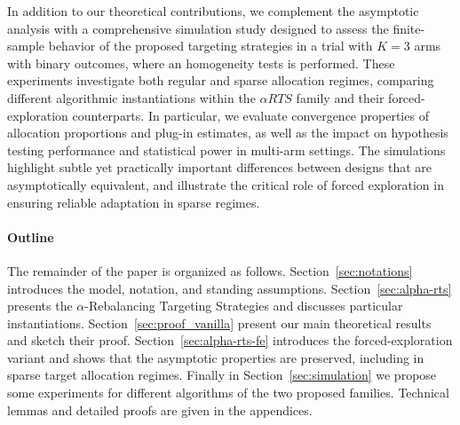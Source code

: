 In addition to our theoretical contributions, we complement the asymptotic analysis with a comprehensive simulation study designed to assess the finite-sample behavior of the proposed targeting strategies in a trial with $K=3$ arms with binary outcomes, where an homogeneity tests is performed. These experiments investigate both regular and sparse allocation regimes, comparing different algorithmic instantiations within the \(\alpha RTS\) family and their forced-exploration counterparts. In particular, we evaluate convergence properties of allocation proportions and plug-in estimates, as well as the impact on hypothesis testing performance and statistical power in multi-arm settings. The simulations highlight subtle yet practically important differences between designs that are asymptotically equivalent, and illustrate the critical role of forced exploration in ensuring reliable adaptation in sparse regimes.


\paragraph*{Outline}
The remainder of the paper is organized as follows. Section~\ref{sec:notations} introduces the model, notation, and standing assumptions. Section~\ref{sec:alpha-rts} presents the $\alpha$-Rebalancing Targeting Strategies and discusses particular instantiations. Section~\ref{sec:proof_vanilla} present our main theoretical results and sketch their proof. Section~\ref{sec:alpha-rts-fe} introduces the forced-exploration variant and shows that the asymptotic properties are preserved, including in sparse target allocation regimes. Finally in Section~\ref{sec:simulation} we propose some experiments for different algorithms of the two proposed families. Technical lemmas and detailed proofs are given in the appendices.

